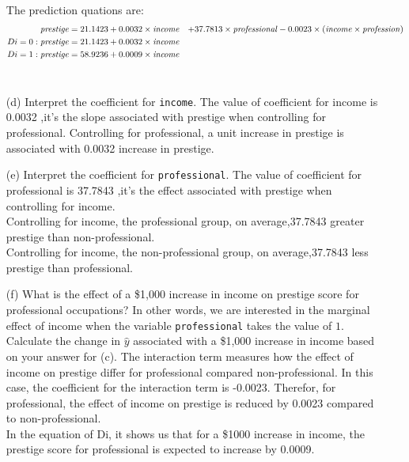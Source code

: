 \documentclass[12pt,letterpaper]{article}
\begin{document}
\begin{enumerate}
	The prediction quations are:
	\begin{align*}
		\text{\emph{prestige}} &= 21.1423 + 0.0032 \times \text{\emph{income}} & + 37.7813 \times \text{\emph{professional}} - 0.0023 \times (\text{\emph{income}} \times \text{\emph{profession}})\\
		Di=0:\text{\emph{prestige}} &= 21.1423 + 0.0032 \times \text{\emph{income}} \\
		Di=1:\text{\emph{prestige}} &= 58.9236 + 0.0009 \times \text{\emph{income}} 
	\end{align*}\\

	
	\item [(d)]
	Interpret the coefficient for \texttt{income}.\vspace{.25cm}
	The value of coefficient for income is 0.0032 ,it's the slope associated with prestige when controlling for professional. Controlling for professional, a unit increase in prestige is associated with 0.0032 increase in prestige.
	\vspace{.25cm}
	\item [(e)]
	Interpret the coefficient for \texttt{professional}.\vspace{.25cm}
	The value of coefficient for professional is 37.7843 ,it's the effect associated with prestige when controlling for income.\\ Controlling for income, the professional group, on average,37.7843 greater prestige than non-professional. \\
	Controlling for income, the non-professional group, on average,37.7843 less prestige than professional. 
	\vspace{.25cm}
	\item [(f)]
	What is the effect of a \$1,000 increase in income on prestige score for professional occupations? In other words, we are interested in the marginal effect of income when the variable \texttt{professional} takes the value of $1$. Calculate the change in $\hat{y}$ associated with a \$1,000 increase in income based on your answer for (c).\vspace{.25cm}
	The interaction term measures how the effect of income on prestige differ for professional compared non-professional. In this case, the coefficient for the interaction term is -0.0023. Therefor, for professional, the effect of income on prestige is reduced by 0.0023 compared to non-professional.\\
	In the equation of Di, it shows us that for a \$1000 increase in income, the prestige score for professional is expected to increase by 0.0009.
	

\end{enumerate}
\end{document}
